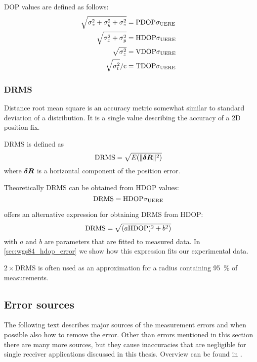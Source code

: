 DOP values are defined as follows:
\begin{subequations}
	\label{eq:dop-def}
\begin{align}
	\sqrt{\sigma^2_x + \sigma^2_y + \sigma^2_z} &= \mathrm{PDOP} \sigma_{\mathrm{UERE}} \\
	\sqrt{\sigma^2_x + \sigma^2_y} &= \mathrm{HDOP} \sigma_{\mathrm{UERE}} \\
	\sqrt{\sigma^2_z} &= \mathrm{VDOP} \sigma_{\mathrm{UERE}} \\
	\sqrt{\sigma^2_t} / \mathrm{c} &= \mathrm{TDOP} \sigma_{\mathrm{UERE}}
\end{align}
\end{subequations}

\subsubsection{DRMS}
Distance root mean square is an accuracy metric somewhat similar to
standard deviation of a distribution.
It is a single value describing the accuracy of a 2D position fix.

DRMS is defined as
\begin{equation}
	\mathrm{DRMS} = \sqrt{E(\lVert\bm{\delta R}\rVert^2)}
\end{equation}
where \(\bm{\delta R}\) is a horizontal component of the position error.

Theoretically DRMS can be obtained from HDOP values:
\begin{equation}
	\mathrm{DRMS} = \mathrm{HDOP} \sigma_{\mathrm{UERE}}
\end{equation}

\cite{www-wilson} offers an alternative expression for obtaining
DRMS from HDOP:
\begin{equation}
	\mathrm{DRMS} = \sqrt{(a \mathrm{HDOP})^2 + b^2)}
\end{equation}
with \(a\) and \(b\) are parameters that are fitted to measured data.
In \autoref{sec:wgs84_hdop_error} we show how this expression fits our experimental data.

\(2 \times \mathrm{DRMS}\) is often used as an approximation for a radius containing
\SI{95}{\percent} of measurements.

\subsection{Error sources}

The following text describes major sources of the measurement errors and when possible
also how to remove the error.
Other than errors mentioned in this section there are many more sources, but they cause inaccuracies
that are negligible for single receiver applications discussed in this thesis.
Overview can be found in \cite{kouba09}.

